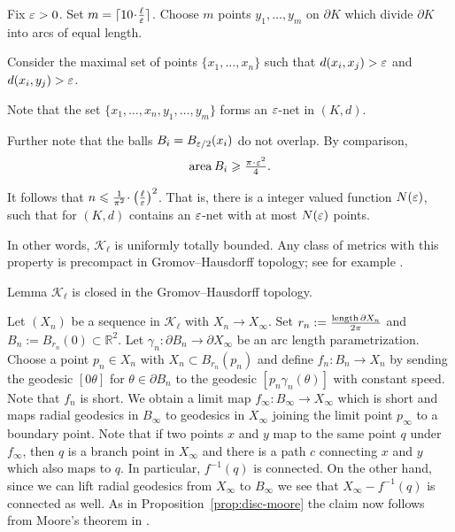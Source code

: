 \documentclass[a4paper,10pt]{amsart}
\begin{document}
Fix $\varepsilon>0$. 
Set $m=\lceil 10\cdot\tfrac\ell\eps\rceil$.
Choose $m$ points $y_1,\dots,y_m$ on $\partial K$
which divide $\partial K$ into arcs of equal length.

Consider the maximal set of points $\{x_1,\dots,x_n\}$ such that $d(x_i,x_j)>\varepsilon$ and $d(x_i,y_j)>\varepsilon$.

Note that the set $\{x_1,\dots,x_n,y_1,\dots,y_m\}$
forms an $\varepsilon$-net in $(K,d)$.

Further note that the balls $B_i=B_{\varepsilon/2}(x_i)$
do not overlap.
By comparison,
\[\area B_i\ge \tfrac{\pi\cdot\eps^2}{4}.\]

It follows that $n\le \tfrac{1}{\pi^2}\cdot\left(\tfrac\ell\eps\right)^2$.
That is, there is a integer valued function $N(\varepsilon)$,
such that for  
$(K,d)$ contains an $\varepsilon$-net
with at most $N(\varepsilon)$ points.

In other words, $\mathcal{K}_\ell$ is uniformly totally bounded.
Any class of metrics with this property is precompact in Gromov--Hausdorff topology; 
see for example \cite[7.4.15]{BBI}.
\qeds





\begin{thm}{Lemma}\label{lem:closed}
$\mathcal{K}_\ell$ is closed in the Gromov--Hausdorff topology.
\end{thm}

Let $(X_n)$ be a sequence in $\mathcal{K}_\ell$ with $X_n\to X_\infty$. Set $r_n:=\frac{\mathop{\rm length}\nolimits\partial X_n}{2\pi}$ and $B_n:=B_{r_n}(0)\subset \mathbb{R}^2$.
Let $\gamma_n:\partial B_n\to\partial X_\infty$ be an arc length parametrization. Choose a point $p_n\in X_n$ with $X_n\subset B_{r_n}(p_n)$ and define
$f_n:B_n\to X_n$ by sending the geodesic $[0\theta]$ for $\theta\in\partial B_n$ to the geodesic $[p_n\gamma_n(\theta)]$ with constant speed. Note that $f_n$ is short.
We obtain a limit map $f_\infty:B_\infty\to X_\infty$ which is short and maps radial geodesics in $B_\infty$ to geodesics in $X_\infty$ joining the limit point $p_\infty$
to a boundary point. Note that if two points $x$  and $y$ map to the same point $q$ under $f_\infty$, then $q$ is a branch point in $X_\infty$ and there is a path $c$ connecting 
$x$ and $y$ which also maps to $q$. In particular, $f^{-1}(q)$ is connected. On the other hand, since we can lift radial geodesics from $X_\infty$ to $B_\infty$ we see that $X_\infty-f^{-1}(q)$
is connected as well. As in Proposition~\ref{prop:disc-moore} the claim now follows from Moore's theorem in \cite{moore}.
\qeds
\end{document}
